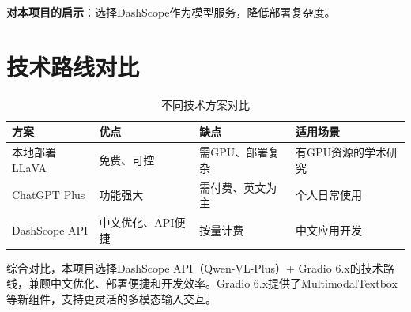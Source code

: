 \textbf{对本项目的启示}：选择DashScope作为模型服务，降低部署复杂度。

\section{技术路线对比}
\label{sec:comparison}

\begin{table}[htbp]
  \centering
  \caption{不同技术方案对比}
  \label{tab:comparison}
  \begin{tabularx}{\textwidth}{|l|X|X|l|}
    \hline
    \textbf{方案} & \textbf{优点} & \textbf{缺点} & \textbf{适用场景} \\
    \hline
    本地部署LLaVA & 免费、可控 & 需GPU、部署复杂 & 有GPU资源的学术研究 \\
    \hline
    ChatGPT Plus & 功能强大 & 需付费、英文为主 & 个人日常使用 \\
    \hline
    DashScope API & 中文优化、API便捷 & 按量计费 & 中文应用开发 \\
    \hline
  \end{tabularx}
\end{table}

综合对比，本项目选择DashScope API（Qwen-VL-Plus）+ Gradio 6.x的技术路线，兼顾中文优化、部署便捷和开发效率。Gradio 6.x提供了MultimodalTextbox等新组件，支持更灵活的多模态输入交互。